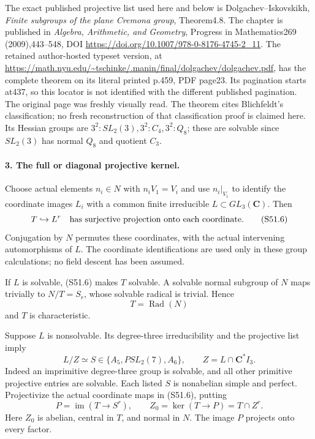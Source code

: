 The exact published projective list used here and below is
Dolgachev--Iskovskikh, \emph{Finite subgroups of the plane
Cremona group}, Theorem4.8. The chapter is published in
\emph{Algebra, Arithmetic, and Geometry}, Progress in
Mathematics269 (2009),443--548, DOI
\url{https://doi.org/10.1007/978-0-8176-4745-2_11}.
The retained author-hosted typeset version, at
\url{https://math.nyu.edu/~tschinke/.manin/final/dolgachev/dolgachev.pdf},
has the complete theorem on its literal printed p.459,
PDF page23. Its pagination starts at437, so this locator is
not identified with the different published pagination. The
original page was freshly visually read. The theorem cites
Blichfeldt's classification; no fresh reconstruction of that
classification proof is claimed here. Its Hessian groups are
\(3^2:SL_2(3),3^2:C_4,3^2:Q_8\); these are solvable since
\(SL_2(3)\) has normal \(Q_8\) and quotient \(C_3\).

\paragraph{3. The full or diagonal projective kernel.}
Choose actual elements \(n_i\in N\) with \(n_iV_1=V_i\)
and use \(n_i|_{V_1}\) to identify the coordinate images
\(L_i\) with a common finite irreducible
\(L\subset GL_3(\mathbf C)\). Then
\[
 T\hookrightarrow L^r
 \quad\hbox{has surjective projection onto each coordinate.}
                                                               \tag{S51.6}
\]
Conjugation by \(N\) permutes these coordinates, with the
actual intervening automorphisms of \(L\). The coordinate
identifications are used only in these group calculations;
no field descent has been assumed.

If \(L\) is solvable, (S51.6) makes \(T\) solvable. A
solvable normal subgroup of \(N\) maps trivially to
\(N/T=S_r\), whose solvable radical is trivial. Hence
\[
                              T=\operatorname{Rad}(N)
                                                               \tag{S51.7}
\]
and \(T\) is characteristic.

Suppose \(L\) is nonsolvable. Its degree-three irreducibility
and the projective list imply
\[
 L/Z\simeq S\in\{A_5,PSL_2(7),A_6\},
       \qquad Z=L\cap\mathbf C^*I_3.                    \tag{S51.8}
\]
Indeed an imprimitive degree-three group is solvable, and
all other primitive projective entries are solvable. Each
listed \(S\) is nonabelian simple and perfect. Projectivize
the actual coordinate maps in (S51.6), putting
\[
 P=\operatorname{im}(T\longrightarrow S^r),\qquad
 Z_0=\ker(T\longrightarrow P)=T\cap Z^r.                \tag{S51.9}
\]
Here \(Z_0\) is abelian, central in \(T\), and normal in
\(N\). The image \(P\) projects onto every factor.

